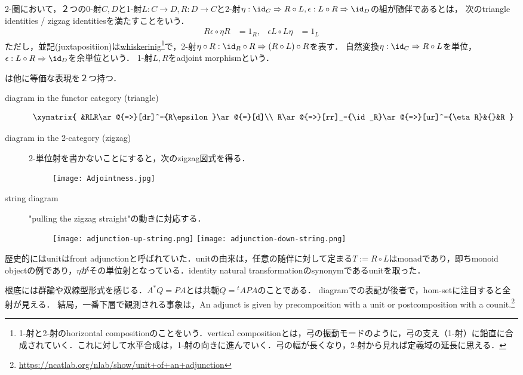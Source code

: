 \documentclass[uplatex,dvipdfmx]{jsreport}
\begin{document}
\begin{definition}
    2-圏において，２つの0-射$C,D$と1-射$L:C\to D,R:D\to C$と2-射$\eta:\id_C\Rightarrow R\circ L,\epsilon:L\circ R\Rightarrow\id_D$の組が随伴であるとは，
    次のtriangle identities / zigzag identitiesを満たすことをいう．
    \begin{align*}
        R\epsilon\circ\eta R&=1_R,&\epsilon L\circ L\eta&=1_L
    \end{align*}
    ただし，並記(juxtapositiion)は\href{https://ncatlab.org/nlab/show/whiskering}{whiskerinig}\footnote{1-射と2-射のhorizontal compositionのことをいう．vertical compositionとは，弓の振動モードのように，弓の支え（1-射）に鉛直に合成されていく．これに対して水平合成は，1-射の向きに進んでいく．弓の幅が長くなり，2-射から見れば定義域の延長に思える．}で，2-射$\eta\circ R:\id_R\circ R\Rightarrow (R\circ L)\circ R$を表す．
    自然変換$\eta:\id_C\Rightarrow R\circ L$を単位，$\epsilon:L\circ R\Rightarrow\id_D$を余単位という．
    1-射$L,R$をadjoint morphismという．
\end{definition}
\begin{remark}
    は他に等価な表現を２つ持つ．
    \begin{description}
        \item[diagram in the functor category (triangle)] 
        \[\xymatrix{
            &RLR\ar@{=>}[dr]^-{R\epsilon}\ar@{=}[d]\\
            R\ar@{=>}[rr]_-{\id_R}\ar@{=>}[ur]^-{\eta R}&{}&R
        }\]
        \item[diagram in the 2-category (zigzag)]
        2-単位射を書かないことにすると，次のzigzag図式を得る．
        \begin{figure}[h]
            \texttt{[image: Adjointness.jpg]}
        \end{figure}
        \item[string diagram]
        "pulling the zigzag straight"の動きに対応する．
        \begin{figure}[h]
            \texttt{[image: adjunction-up-string.png]}
            \texttt{[image: adjunction-down-string.png]}
        \end{figure}
    \end{description}
\end{remark}
\begin{remark}
    歴史的にはunitはfront adjunctionと呼ばれていた．unitの由来は，任意の随伴に対して定まる$T:=R\circ L$はmonadであり，即ちmonoid objectの例であり，$\eta$がその単位射となっている．identity natural transformationのsynonymであるunitを取った．
\end{remark}
\begin{remarks}
    根底には群論や双線型形式を感じる．$A^*Q=PA$とは共軛$Q={}^t\!APA$のことである．
    diagramでの表記が後者で，hom-setに注目すると全射が見える．
    結局，一番下層で観測される事象は，An adjunct is given by precomposition with a unit or postcomposition with a counit.\footnote{\url{https://ncatlab.org/nlab/show/unit+of+an+adjunction}}
\end{remarks}
\end{document}
